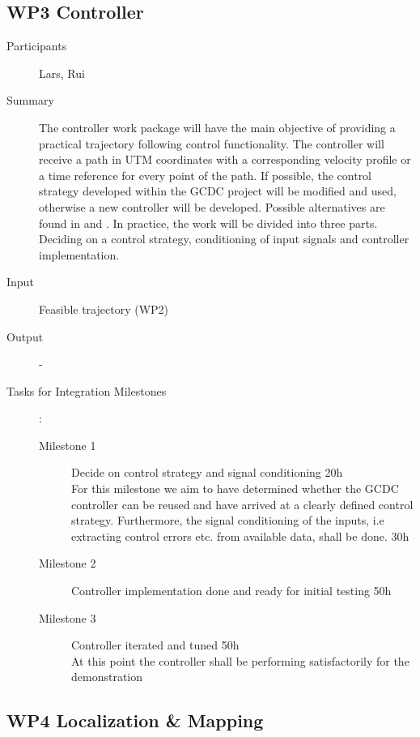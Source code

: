 \documentclass[11pt,a4paper]{article}
\begin{document}
\subsection{WP3 Controller}

\begin{description}
\item[Participants] Lars, Rui
\item[Summary]
The controller work package will have the main objective of providing a practical trajectory following control functionality. The controller will receive a path in UTM coordinates with a corresponding velocity profile or a time reference for every point of the path. If possible, the control strategy developed within the GCDC project will be modified and used, otherwise a new controller will be developed. Possible alternatives are found in \cite{werling2010tracking} and \cite{lima2015}. In practice, the work will be divided into three parts. Deciding on a control strategy, conditioning of input signals and controller implementation. 
\item[Input]
Feasible trajectory (WP2)
\item[Output] -
\item[Tasks for Integration Milestones]:\
	\begin{description}
		\item[Milestone 1] Decide on control strategy and signal conditioning 20h\\
		
			For this milestone we aim to have determined whether the GCDC controller can be reused 
			and have arrived at a clearly defined control strategy. Furthermore, the signal conditioning 
			of the inputs, i.e extracting control errors etc. from available data, shall be done. 30h
		\item[Milestone 2] Controller implementation done and ready for initial testing 50h
		\item[Milestone 3] Controller iterated and tuned 50h\\
		
			At this point the controller shall be performing satisfactorily for the demonstration
	\end{description}	 
\end{description}

\subsection{WP4 Localization \& Mapping}
\end{document}
